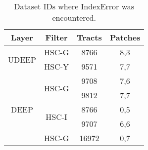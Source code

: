 \begin{table}[h]
\centering
\begin{tabular} {|c|c|c|c|}
\hline
Layer & Filter & Tracts  & Patches  \\
\hline

\multirow{2}{*}{UDEEP} & HSC-G                  & 8766  & 8,3 \\ \cline{2-4}
                       & HSC-Y                  & 9571  & 7,7 \\ \hline
\multirow{5}{*}{DEEP}  & \multirow{2}{*}{HSC-G} & 9708  & 7,6 \\ \cline{3-4}
                       &                        & 9812  & 7,7 \\ \cline{2-4}
                       & \multirow{2}{*}{HSC-I} & 8766  & 0,5 \\ \cline{3-4}
                       &                        & 9707  & 6,6 \\ \hline
WIDE                   & HSC-G                  & 16972 & 0,7 \\
\hline
\end{tabular}
\caption{Dataset IDs where IndexError was encountered.}
\label{table1}
\end{table}
